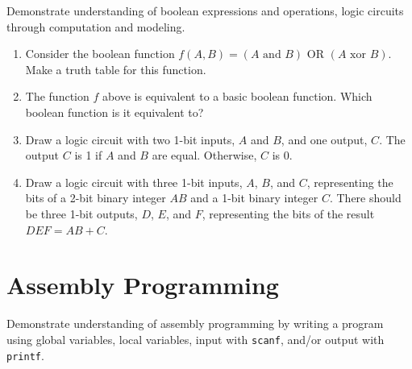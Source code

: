 \documentclass[12pt]{article}
\begin{document}
Demonstrate understanding of boolean expressions and operations, logic circuits through computation and modeling.

\begin{enumerate}
\item Consider the boolean function $f(A,B) = (A\textrm{ and }B)\textrm{ OR }(A\textrm{ xor }B)$. Make a truth table for this function.
\vfill

\item The function $f$ above is equivalent to a basic boolean function. Which boolean function is it equivalent to?
\vfill

\pagebreak

\item Draw a logic circuit with two 1-bit inputs, $A$ and $B$, and one output, $C$. The output $C$ is 1 if $A$ and $B$ are equal. Otherwise, $C$ is 0.
\vfill

\item Draw a logic circuit with three 1-bit inputs, $A$, $B$, and $C$, representing the bits of a 2-bit binary integer $AB$ and a 1-bit binary integer $C$. There should be three 1-bit outputs, $D$, $E$, and $F$, representing the bits of the result $DEF = AB + C$.
\vfill
\end{enumerate}

\vfill

\standardsfooter

\newpage



\section*{Assembly Programming}

Demonstrate understanding of assembly programming by writing a program using global variables, local variables, input with \texttt{scanf}, and/or output with \texttt{printf}.
\end{document}

